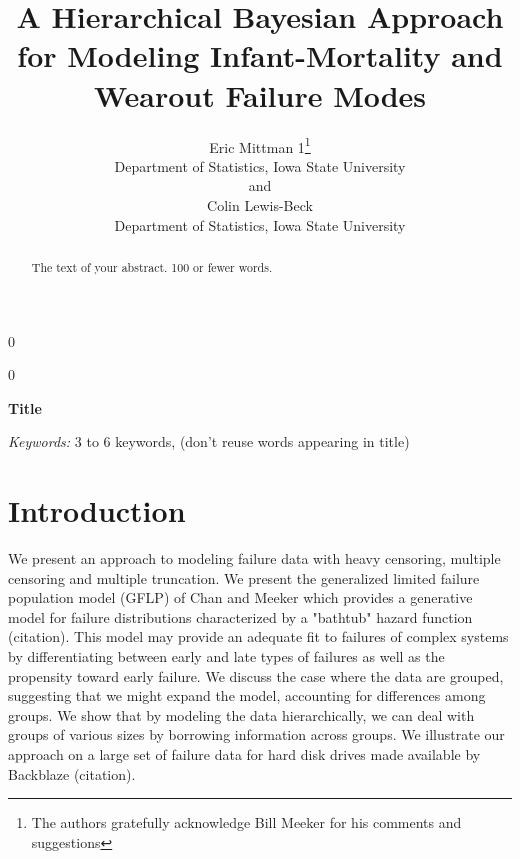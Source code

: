 \documentclass[12pt]{article}
\newcommand{\blind}{0}
\begin{document}
%

\def\spacingset#1{\renewcommand{\baselinestretch}%
{#1}\small\normalsize} \spacingset{1}



\blind
{
  \title{\bf A Hierarchical Bayesian Approach for Modeling Infant-Mortality and Wearout Failure Modes}
  \author{Eric Mittman 1\thanks{
    The authors gratefully acknowledge Bill Meeker for his comments and suggestions}\hspace{.2cm}\\
    Department of Statistics, Iowa State University\\
    and \\
    Colin Lewis-Beck \\
    Department of Statistics, Iowa State University}
  \maketitle
} \fi

\blind
{
  \bigskip
  \bigskip
  \bigskip
  \begin{center}
    {\LARGE\bf Title}
\end{center}
  \medskip
} \fi

\bigskip
\begin{abstract}
The text of your abstract.  100 or fewer words.
\end{abstract}

\noindent%
{\it Keywords:}  3 to 6 keywords, (don't reuse words appearing in title)
\vfill

\newpage
\spacingset{1.45} %
\section{Introduction}
We present an approach to modeling failure data with heavy censoring, multiple censoring and multiple truncation. We present the generalized limited failure population model (GFLP) of Chan and Meeker which provides a generative model for failure distributions characterized by a "bathtub" hazard function (citation). This model may provide an adequate fit to failures of complex systems by differentiating between early and late types of failures as well as the propensity toward early failure. We discuss the case where the data are grouped, suggesting that we might expand the model, accounting for differences among groups. We show that by modeling the data hierarchically, we can deal with groups of various sizes by borrowing information across groups. We illustrate our approach on a large set of failure data for hard disk drives made available by Backblaze (citation). 
\end{document}
